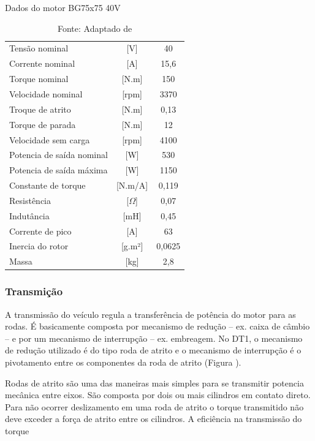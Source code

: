 \begin{table}[H]
	\centering
	\caption{Dados do motor BG75x75 40V}
	\label{tab:dadosBg75}
	\begin{tabular}{lcc}
		\toprule
		Tensão nominal            & {[}V{]}        & 40     \\
		Corrente nominal          & {[}A{]}        & 15,6   \\
		Torque nominal            & {[}N.m{]}      & 150    \\
		Velocidade nominal        & {[}rpm{]}      & 3370   \\
		Troque de atrito          & {[}N.m{]}      & 0,13   \\
		Torque de parada          & {[}N.m{]}      & 12     \\
		Velocidade sem carga      & {[}rpm{]}      & 4100   \\
		Potencia de saída nominal & {[}W{]}        & 530    \\
		Potencia de saída máxima  & {[}W{]}        & 1150   \\
		Constante de torque       & {[}N.m/A{]}    & 0,119  \\
		Resistência               & {[}$\Omega${]} & 0,07   \\
		Indutância                & {[}mH{]}       & 0,45   \\
		Corrente de pico          & {[}A{]}        & 63     \\
		Inercia do rotor          & {[}g.m²{]}     & 0,0625 \\
		Massa                     & {[}kg{]}       & 2,8    \\
		\bottomrule
	\end{tabular}
	\caption*{\footnotesize Fonte: Adaptado de }
\end{table}

\subsubsection{Transmição}

A transmissão do veículo regula a transferência de potência do motor para as rodas. É basicamente composta por mecanismo de
redução -- ex. caixa de câmbio -- e por um mecanismo de interrupção -- ex. embreagem\cite{book:Modern_Electric_Vehicles}.
No DT1, o mecanismo de redução utilizado é do tipo roda de atrito e o mecanismo de interrupção é o pivotamento entre os componentes da roda de atrito (Figura ).

Rodas de atrito são uma das maneiras mais simples para se transmitir potencia mecânica entre eixos. São composta por dois ou mais cilindros em contato direto.  
Para não ocorrer deslizamento em uma roda de atrito o torque transmitido não deve exceder a força de atrito entre os cilindros. A eficiência na transmissão do torque 

